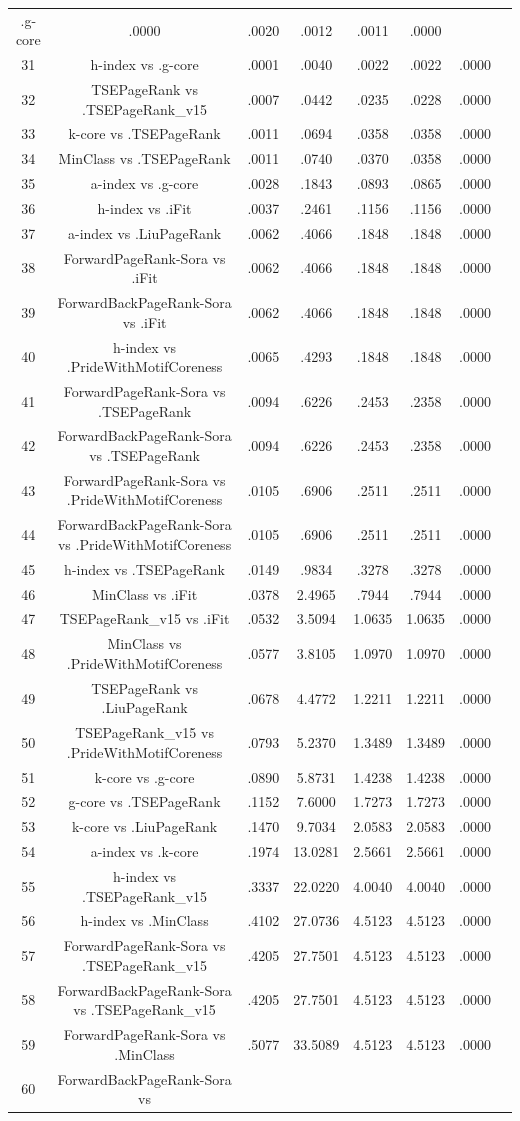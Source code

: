 \documentclass[a4paper,10pt]{article}
\begin{document}
\begin{landscape}
\begin{table}[!htp]
\begin{tabular}{cccccccc}
.g-core&.0000&.0020&.0012&.0011&.0000\\31&h-index vs .g-core&.0001&.0040&.0022&.0022&.0000\\32&TSEPageRank vs .TSEPageRank_v15&.0007&.0442&.0235&.0228&.0000\\33&k-core vs .TSEPageRank&.0011&.0694&.0358&.0358&.0000\\34&MinClass vs .TSEPageRank&.0011&.0740&.0370&.0358&.0000\\35&a-index vs .g-core&.0028&.1843&.0893&.0865&.0000\\36&h-index vs .iFit&.0037&.2461&.1156&.1156&.0000\\37&a-index vs .LiuPageRank&.0062&.4066&.1848&.1848&.0000\\38&ForwardPageRank-Sora vs .iFit&.0062&.4066&.1848&.1848&.0000\\39&ForwardBackPageRank-Sora vs .iFit&.0062&.4066&.1848&.1848&.0000\\40&h-index vs .PrideWithMotifCoreness&.0065&.4293&.1848&.1848&.0000\\41&ForwardPageRank-Sora vs .TSEPageRank&.0094&.6226&.2453&.2358&.0000\\42&ForwardBackPageRank-Sora vs .TSEPageRank&.0094&.6226&.2453&.2358&.0000\\43&ForwardPageRank-Sora vs .PrideWithMotifCoreness&.0105&.6906&.2511&.2511&.0000\\44&ForwardBackPageRank-Sora vs .PrideWithMotifCoreness&.0105&.6906&.2511&.2511&.0000\\45&h-index vs .TSEPageRank&.0149&.9834&.3278&.3278&.0000\\46&MinClass vs .iFit&.0378&2.4965&.7944&.7944&.0000\\47&TSEPageRank_v15 vs .iFit&.0532&3.5094&1.0635&1.0635&.0000\\48&MinClass vs .PrideWithMotifCoreness&.0577&3.8105&1.0970&1.0970&.0000\\49&TSEPageRank vs .LiuPageRank&.0678&4.4772&1.2211&1.2211&.0000\\50&TSEPageRank_v15 vs .PrideWithMotifCoreness&.0793&5.2370&1.3489&1.3489&.0000\\51&k-core vs .g-core&.0890&5.8731&1.4238&1.4238&.0000\\52&g-core vs .TSEPageRank&.1152&7.6000&1.7273&1.7273&.0000\\53&k-core vs .LiuPageRank&.1470&9.7034&2.0583&2.0583&.0000\\54&a-index vs .k-core&.1974&13.0281&2.5661&2.5661&.0000\\55&h-index vs .TSEPageRank_v15&.3337&22.0220&4.0040&4.0040&.0000\\56&h-index vs .MinClass&.4102&27.0736&4.5123&4.5123&.0000\\57&ForwardPageRank-Sora vs .TSEPageRank_v15&.4205&27.7501&4.5123&4.5123&.0000\\58&ForwardBackPageRank-Sora vs .TSEPageRank_v15&.4205&27.7501&4.5123&4.5123&.0000\\59&ForwardPageRank-Sora vs .MinClass&.5077&33.5089&4.5123&4.5123&.0000\\60&ForwardBackPageRank-Sora vs 
\end{tabular}
\end{table}
\end{landscape}
\end{document}
